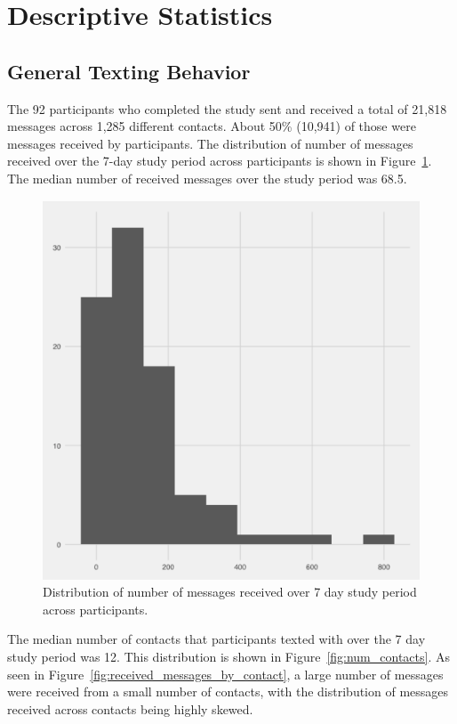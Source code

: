 \documentclass[12pt]{nuthesis}	%
\begin{document}
\section{Descriptive Statistics}

\subsection{General Texting Behavior}
\label{sec:texting}

The 92 participants who completed the study sent and received a total of 21,818 messages across 1,285 different contacts. About 50\% (10,941) of those were messages received by participants. The distribution of number of messages received over the 7-day study period across participants is shown in Figure~\ref{fig:received_messages}. The median number of received messages over the study period was 68.5. 

\begin{figure}[h]
\centering
\includegraphics[width=.7\textwidth]{figures/all_messages_received_distribution}
\caption{Distribution of number of messages received over 7 day study period across participants.}
\label{fig:received_messages}
\end{figure}

The median number of contacts that participants texted with over the 7 day study period was 12. This distribution is shown in Figure~\ref{fig:num_contacts}. As seen in Figure~\ref{fig:received_messages_by_contact}, a large number of messages were received from a small number of contacts, with the distribution of messages received across contacts being highly skewed.
\end{document}
